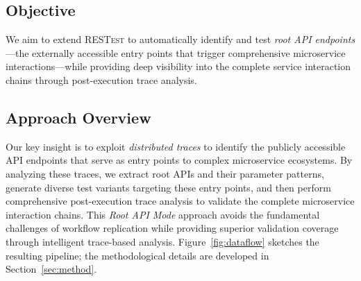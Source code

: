 \documentclass[conference]{IEEEtran}
\begin{document}
\subsection*{Objective}
We aim to extend \textsc{RESTest} to automatically identify and test \emph{root API endpoints}—the externally accessible entry points that trigger comprehensive microservice interactions—while providing deep visibility into the complete service interaction chains through post-execution trace analysis.

\subsection*{Approach Overview}
Our key insight is to exploit \emph{distributed traces} to identify the publicly accessible API endpoints that serve as entry points to complex microservice ecosystems. By analyzing these traces, we extract root APIs and their parameter patterns, generate diverse test variants targeting these entry points, and then perform comprehensive post-execution trace analysis to validate the complete microservice interaction chains. This \emph{Root API Mode} approach avoids the fundamental challenges of workflow replication while providing superior validation coverage through intelligent trace-based analysis. Figure~\ref{fig:dataflow} sketches the resulting pipeline; the methodological details are developed in Section~\ref{sec:method}.







\end{document}

